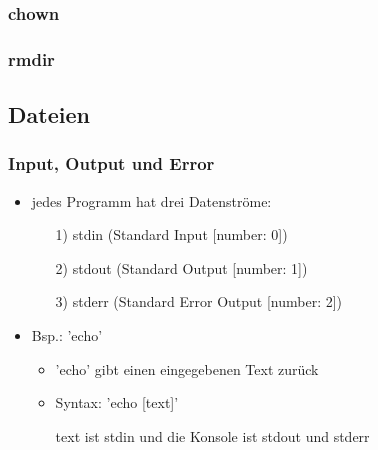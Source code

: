 \documentclass[12pt,utf8]{beamer}
\begin{document}
\begin{frame}
\frametitle{chown}
\end{frame}

\begin{frame}
\frametitle{rmdir}
\end{frame}

\subsection{Dateien}
\begin{frame}
\frametitle{Input, Output und Error}
\begin{itemize}
	\item jedes Programm hat drei Datenströme:
	\begin{itemize}
		\item[1)] stdin (Standard Input [number: 0])
		\item[2)] stdout (Standard Output [number: 1])
		\item[3)] stderr (Standard Error Output [number: 2])
	\end{itemize}
	\item Bsp.: 'echo'
	\begin{itemize}[<+->]
		\item 'echo' gibt einen eingegebenen Text zurück
		\item Syntax: 'echo [text]'
		\item [text] ist stdin und die Konsole ist stdout und stderr
	\end{itemize}
\end{itemize}
\end{frame}
\end{document}
